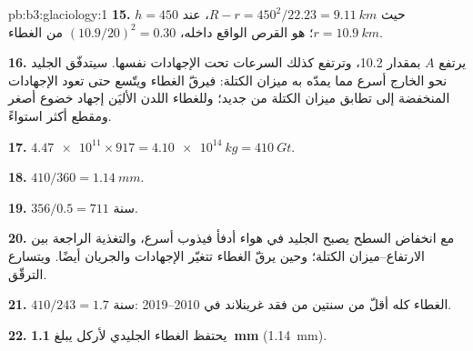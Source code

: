 \begin{solution}{pb:b3:glaciology:1}
\textbf{15.} $h = 450$ حيث $R - r = 450^2/22.23 = \qty{9.11}{km}$، عند
$r = \qty{10.9}{km}$؛  هو القرص الواقع داخله، $(10.9/
20)^2 = 0.30$ من الغطاء.

\textbf{16.} يرتفع $A$ بمقدار \num{10.2}، وترتفع كذلك السرعات تحت الإجهادات
نفسها. سيتدفّق الجليد نحو الخارج أسرع مما يمدّه به ميزان الكتلة:
فيرقّ الغطاء ويتّسع حتى تعود الإجهادات المنخفضة إلى تطابق ميزان الكتلة
من جديد؛ وللغطاء اللدن الأليَن إجهاد خضوع أصغر
ومقطع أكثر استواءً.

\textbf{17.} $\num{4.47e11}\times917 = \qty{4.10e14}{kg} = \qty{410}{Gt}$.

\textbf{18.} $410/360 = \qty{1.14}{mm}$.

\textbf{19.} $356/0.5 = 711$ سنة.

\textbf{20.} مع انخفاض السطح يصبح الجليد في هواء أدفأ فيذوب أسرع،
والتغذية الراجعة بين الارتفاع--ميزان الكتلة؛ وحين يرقّ الغطاء تتغيّر
الإجهادات والجريان أيضًا. ويتسارع الترقّق.

\textbf{21.} $410/243 = \num{1.7}\text{ سنة}$: الغطاء كله أقلّ من سنتين من
فقد غرينلاند في 2010--2019.

\textbf{22.} يحتفظ الغطاء الجليدي لأركل  يبلغ
\textbf{\qty[text-series-to-math=true]{1.1}{mm}} (\qty{1.14}{mm}).
\end{solution}
